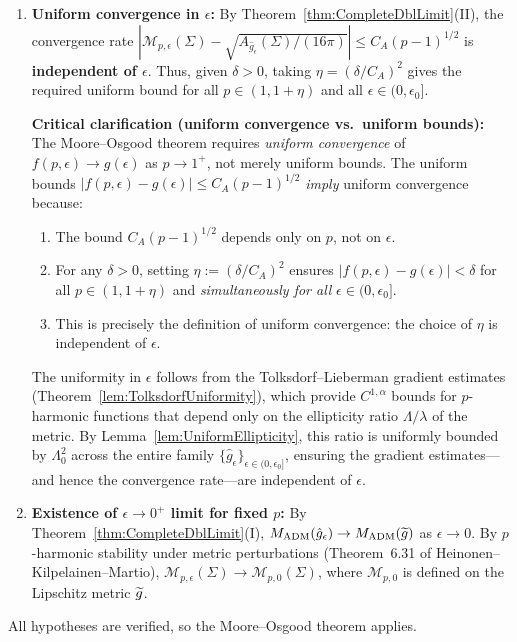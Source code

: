 \begin{lemma}
\begin{enumerate}
    \item[(MO2)] \textbf{Uniform convergence in $\epsilon$:} By Theorem~\ref{thm:CompleteDblLimit}(II), the convergence rate $|\mathcal{M}_{p,\epsilon}(\Sigma) - \sqrt{A_{\hat{g}_\epsilon}(\Sigma)/(16\pi)}| \le C_A(p-1)^{1/2}$ is \textbf{independent of $\epsilon$}. Thus, given $\delta > 0$, taking $\eta = (\delta/C_A)^2$ gives the required uniform bound for all $p \in (1, 1+\eta)$ and all $\epsilon \in (0, \epsilon_0]$.
    
    \textbf{Critical clarification (uniform convergence vs.\ uniform bounds):} The Moore--Osgood theorem requires \emph{uniform convergence} of $f(p, \epsilon) \to g(\epsilon)$ as $p \to 1^+$, not merely uniform bounds. The uniform bounds $|f(p,\epsilon) - g(\epsilon)| \le C_A(p-1)^{1/2}$ \emph{imply} uniform convergence because:
    \begin{enumerate}
        \item The bound $C_A(p-1)^{1/2}$ depends only on $p$, not on $\epsilon$.
        \item For any $\delta > 0$, setting $\eta := (\delta/C_A)^2$ ensures $|f(p,\epsilon) - g(\epsilon)| < \delta$ for all $p \in (1, 1+\eta)$ and \emph{simultaneously for all} $\epsilon \in (0, \epsilon_0]$.
        \item This is precisely the definition of uniform convergence: the choice of $\eta$ is independent of $\epsilon$.
    \end{enumerate}
    The uniformity in $\epsilon$ follows from the Tolksdorf--Lieberman gradient estimates (Theorem~\ref{lem:TolksdorfUniformity}), which provide $C^{1,\alpha}$ bounds for $p$-harmonic functions that depend only on the ellipticity ratio $\Lambda/\lambda$ of the metric. By Lemma~\ref{lem:UniformEllipticity}, this ratio is uniformly bounded by $\Lambda_0^2$ across the entire family $\{\hat{g}_\epsilon\}_{\epsilon \in (0, \epsilon_0]}$, ensuring the gradient estimates---and hence the convergence rate---are independent of $\epsilon$.
    
    \item[(MO3)] \textbf{Existence of $\epsilon \to 0^+$ limit for fixed $p$:} By Theorem~\ref{thm:CompleteDblLimit}(I), $M_{\mathrm{ADM}}(\hat{g}_\epsilon) \to M_{\mathrm{ADM}}(\widetilde{g})$ as $\epsilon \to 0$. By $p$-harmonic stability under metric perturbations (Theorem~6.31 of Heinonen--Kilpelainen--Martio), $\mathcal{M}_{p,\epsilon}(\Sigma) \to \mathcal{M}_{p,0}(\Sigma)$, where $\mathcal{M}_{p,0}$ is defined on the Lipschitz metric $\widetilde{g}$.
\end{enumerate}
All hypotheses are verified, so the Moore--Osgood theorem applies.
\end{lemma}

